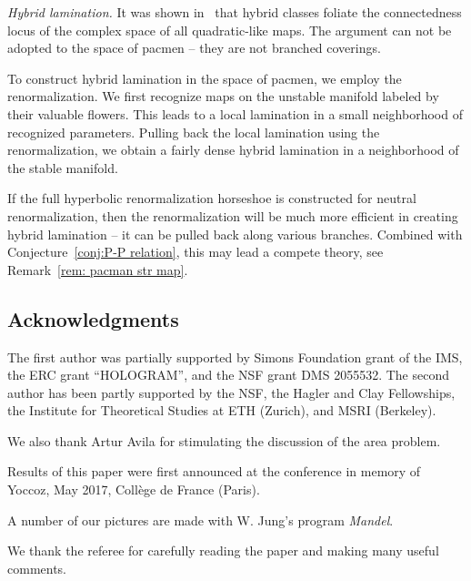 \documentclass{amsart}
\newcommand{\1}{{\mathbb 1 }}
\theoremstyle{remark}
\numberwithin{equation}{section}
\theoremstyle{definition}
\theoremstyle{nonumberbreak}
\begin{document}


\emph{Hybrid lamination.}
It was shown in~\cite{L:FCT} that hybrid classes foliate the connectedness locus of the complex space of all quadratic-like maps. The argument can not be adopted to the space of pacmen -- they are not branched coverings. 

To construct hybrid lamination in the space of pacmen, we employ the renormalization. We first recognize maps on the unstable manifold labeled by their valuable flowers. This leads to a local lamination in a small neighborhood of recognized parameters. Pulling back the local lamination using the renormalization, we obtain a fairly dense hybrid lamination in a neighborhood of the stable manifold. 

If the full hyperbolic renormalization horseshoe is constructed for neutral renormalization, then the renormalization will be much more efficient in creating hybrid lamination -- it can be pulled back along various branches. Combined with Conjecture~\ref{conj:P-P relation}, this may lead a compete theory, see Remark~\ref{rem: pacman str map}.   









\subsection*{Acknowledgments} The first author was partially supported by Simons Foundation grant of the IMS,  the ERC grant ``HOLOGRAM'', and the NSF grant DMS
2055532. The second author has been partly supported by the NSF, the Hagler and Clay Fellowships, the Institute for Theoretical Studies at ETH (Zurich), and MSRI (Berkeley).

We also thank Artur Avila for stimulating the discussion of the area problem.

Results of this paper were first announced at the conference in memory of Yoccoz, May 2017, Coll\`ege de France (Paris).


A number of our pictures are made with W. Jung's program \emph{Mandel}.

We thank the referee for carefully reading the paper and making many useful comments. 
\end{document}
